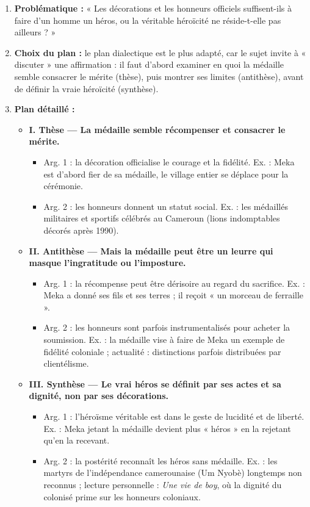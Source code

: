 \documentclass[11pt]{article}
\newcommand{\cle}[1]{{\popxbold\color{popdark}#1}}
\begin{document}
\begin{corrige}
\begin{enumerate}
\item \textbf{Problématique :} « Les décorations et les honneurs officiels suffisent-ils à faire d'un homme un héros, ou la véritable héroïcité ne réside-t-elle pas ailleurs ? »
\item \textbf{Choix du plan :} le plan \cle{dialectique} est le plus adapté, car le sujet invite à « discuter » une affirmation : il faut d'abord examiner en quoi la médaille semble consacrer le mérite (thèse), puis montrer ses limites (antithèse), avant de définir la vraie héroïcité (synthèse).
\item \textbf{Plan détaillé :}
\begin{itemize}
\item \textbf{I. Thèse — La médaille semble récompenser et consacrer le mérite.}
\begin{itemize}
\item Arg. 1 : la décoration officialise le courage et la fidélité. Ex. : Meka est d'abord fier de sa médaille, le village entier se déplace pour la cérémonie.
\item Arg. 2 : les honneurs donnent un statut social. Ex. : les médaillés militaires et sportifs célébrés au Cameroun (lions indomptables décorés après 1990).
\end{itemize}
\item \textbf{II. Antithèse — Mais la médaille peut être un leurre qui masque l'ingratitude ou l'imposture.}
\begin{itemize}
\item Arg. 1 : la récompense peut être dérisoire au regard du sacrifice. Ex. : Meka a donné ses fils et ses terres ; il reçoit « un morceau de ferraille ».
\item Arg. 2 : les honneurs sont parfois instrumentalisés pour acheter la soumission. Ex. : la médaille vise à faire de Meka un exemple de fidélité coloniale ; actualité : distinctions parfois distribuées par clientélisme.
\end{itemize}
\item \textbf{III. Synthèse — Le vrai héros se définit par ses actes et sa dignité, non par ses décorations.}
\begin{itemize}
\item Arg. 1 : l'héroïsme véritable est dans le geste de lucidité et de liberté. Ex. : Meka jetant la médaille devient plus « héros » en la rejetant qu'en la recevant.
\item Arg. 2 : la postérité reconnaît les héros sans médaille. Ex. : les martyrs de l'indépendance camerounaise (Um Nyobè) longtemps non reconnus ; lecture personnelle : \emph{Une vie de boy}, où la dignité du colonisé prime sur les honneurs coloniaux.
\end{itemize}
\end{itemize}
\end{enumerate}
\end{corrige}
\end{document}
